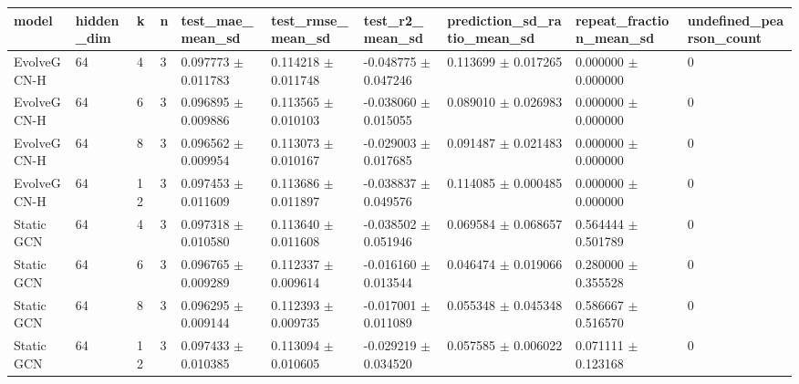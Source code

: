 \begin{tabular}{llllllllll}
\hline
model & hidden\_dim & k & n & test\_mae\_mean\_sd & test\_rmse\_mean\_sd & test\_r2\_mean\_sd & prediction\_sd\_ratio\_mean\_sd & repeat\_fraction\_mean\_sd & undefined\_pearson\_count \\
\hline
EvolveGCN-H & 64 & 4 & 3 & 0.097773 $\pm$ 0.011783 & 0.114218 $\pm$ 0.011748 & -0.048775 $\pm$ 0.047246 & 0.113699 $\pm$ 0.017265 & 0.000000 $\pm$ 0.000000 & 0 \\
EvolveGCN-H & 64 & 6 & 3 & 0.096895 $\pm$ 0.009886 & 0.113565 $\pm$ 0.010103 & -0.038060 $\pm$ 0.015055 & 0.089010 $\pm$ 0.026983 & 0.000000 $\pm$ 0.000000 & 0 \\
EvolveGCN-H & 64 & 8 & 3 & 0.096562 $\pm$ 0.009954 & 0.113073 $\pm$ 0.010167 & -0.029003 $\pm$ 0.017685 & 0.091487 $\pm$ 0.021483 & 0.000000 $\pm$ 0.000000 & 0 \\
EvolveGCN-H & 64 & 12 & 3 & 0.097453 $\pm$ 0.011609 & 0.113686 $\pm$ 0.011897 & -0.038837 $\pm$ 0.049576 & 0.114085 $\pm$ 0.000485 & 0.000000 $\pm$ 0.000000 & 0 \\
Static GCN & 64 & 4 & 3 & 0.097318 $\pm$ 0.010580 & 0.113640 $\pm$ 0.011608 & -0.038502 $\pm$ 0.051946 & 0.069584 $\pm$ 0.068657 & 0.564444 $\pm$ 0.501789 & 0 \\
Static GCN & 64 & 6 & 3 & 0.096765 $\pm$ 0.009289 & 0.112337 $\pm$ 0.009614 & -0.016160 $\pm$ 0.013544 & 0.046474 $\pm$ 0.019066 & 0.280000 $\pm$ 0.355528 & 0 \\
Static GCN & 64 & 8 & 3 & 0.096295 $\pm$ 0.009144 & 0.112393 $\pm$ 0.009735 & -0.017001 $\pm$ 0.011089 & 0.055348 $\pm$ 0.045348 & 0.586667 $\pm$ 0.516570 & 0 \\
Static GCN & 64 & 12 & 3 & 0.097433 $\pm$ 0.010385 & 0.113094 $\pm$ 0.010605 & -0.029219 $\pm$ 0.034520 & 0.057585 $\pm$ 0.006022 & 0.071111 $\pm$ 0.123168 & 0 \\
\hline
\end{tabular}
